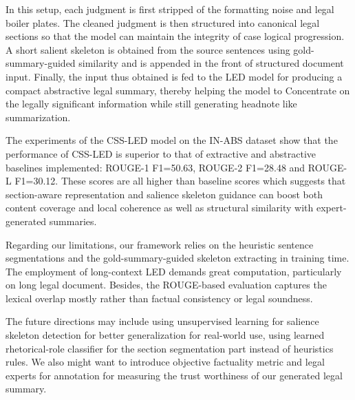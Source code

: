 \documentclass[11pt, a4paper]{article}
\theoremstyle{plain}%
\theoremstyle{remark}%
\theoremstyle{definition}%
\begin{document}
In this setup, each judgment is first stripped of the formatting noise and legal boiler plates. The cleaned judgment is then structured into canonical legal sections so that the model can maintain the integrity of case logical progression. A short salient skeleton is obtained from the source sentences using gold-summary-guided similarity and is appended in the front of structured document input. Finally, the input thus obtained is fed to the LED model for producing a compact abstractive legal summary, thereby helping the model to Concentrate on the legally significant information while still generating headnote like summarization.

The experiments of the CSS-LED model on the IN-ABS dataset show that the performance of CSS-LED is superior to that of extractive and abstractive baselines implemented: ROUGE-1 F1=50.63, ROUGE-2 F1=28.48 and ROUGE-L F1=30.12. These scores are all higher than baseline scores which suggests that section-aware representation and salience skeleton guidance can boost both content coverage and local coherence as well as structural similarity with expert-generated summaries.

Regarding our limitations, our framework relies on the heuristic sentence segmentations and the gold-summary-guided skeleton extracting in training time. The employment of long-context LED demands great computation, particularly on long legal document. Besides, the ROUGE-based evaluation captures the lexical overlap mostly rather than factual consistency or legal soundness.

The future directions may include using unsupervised learning for salience skeleton detection for better generalization for real-world use, using learned rhetorical-role classifier for the section segmentation part instead of heuristics rules. We also might want to introduce objective factuality metric and legal experts for annotation for measuring the trust worthiness of our generated legal summary.
\end{document}

